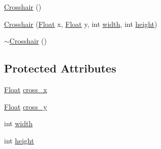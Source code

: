 \begin{DoxyCompactItemize}
\item 
\hyperlink{classZeta_1_1Crosshair_a441af6130b2127f851bb302ad6720a1c}{Crosshair} ()
\item 
\hyperlink{classZeta_1_1Crosshair_aa0f08149374c9d2baf223187118b9142}{Crosshair} (\hyperlink{namespaceZeta_a1e0a1265f9b3bd3075fb0fabd39088ba}{Float} x, \hyperlink{namespaceZeta_a1e0a1265f9b3bd3075fb0fabd39088ba}{Float} y, int \hyperlink{classZeta_1_1Crosshair_aabcdae88e34ee8532c8d755adc9504c4}{width}, int \hyperlink{classZeta_1_1Crosshair_a18b73261c9cebb4413675105c0ff25a9}{height})
\item 
\hyperlink{classZeta_1_1Crosshair_a68a0549b1aa820acf65beb233cf554be}{$\sim$\+Crosshair} ()
\end{DoxyCompactItemize}
\subsection*{Protected Attributes}
\begin{DoxyCompactItemize}
\item 
\hyperlink{namespaceZeta_a1e0a1265f9b3bd3075fb0fabd39088ba}{Float} \hyperlink{classZeta_1_1Crosshair_a44ec60aa2174dac29978ded67f854b7a}{cross\+\_\+x}
\item 
\hyperlink{namespaceZeta_a1e0a1265f9b3bd3075fb0fabd39088ba}{Float} \hyperlink{classZeta_1_1Crosshair_adfcdf50feef48497972cae1467a59260}{cross\+\_\+y}
\item 
int \hyperlink{classZeta_1_1Crosshair_aabcdae88e34ee8532c8d755adc9504c4}{width}
\item 
int \hyperlink{classZeta_1_1Crosshair_a18b73261c9cebb4413675105c0ff25a9}{height}
\end{DoxyCompactItemize}


